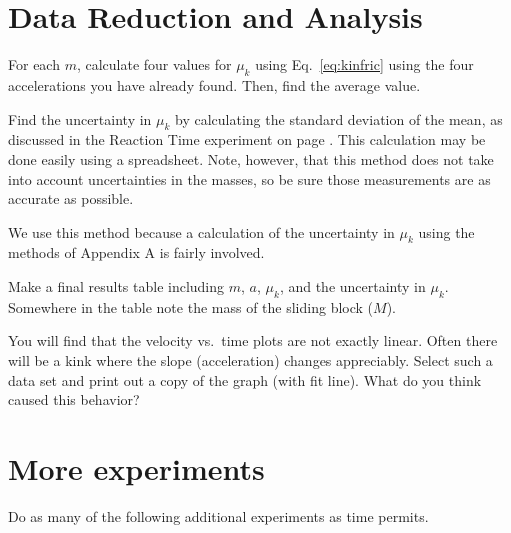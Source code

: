 \section*{Data Reduction and Analysis}

For each $m$, calculate four values for $\mu_{k}$ using Eq.~\ref{eq:kinfric}  
using the four accelerations you have already found.  Then, find the average value.

Find the uncertainty in $\mu_{k}$ by calculating the standard deviation
of the mean, as discussed in the Reaction Time experiment on page \pageref{exp:react}.
This calculation may be done easily using a spreadsheet.  Note, however, that 
this method does not take into account uncertainties in the masses, so be
sure those measurements are as accurate as possible.  

We use this method 
because a calculation of the uncertainty in
$\mu_{k}$ using the methods of Appendix A is fairly involved. 

%

Make a final results table including $m$, $a$, $\mu_{k}$, and
the uncertainty in $\mu_{k}$.  
Somewhere in the table note the mass of the sliding block ($M$).

You will find that the velocity vs.\ time plots are not exactly
linear.  Often there will be a kink where the slope (acceleration)
changes appreciably.  Select such a data set and print out a copy of 
the graph (with fit line).  What do you think caused this behavior?

\section*{More experiments}

Do as many of the following additional experiments as time permits.

